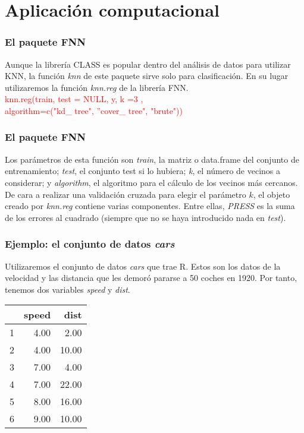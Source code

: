 \documentclass{beamer}
\theoremstyle{definition}
\begin{document}
\section{Aplicación computacional}

\begin{frame}
\frametitle{El paquete FNN}
Aunque la librería CLASS es popular dentro del análisis de datos para utilizar KNN, la función \textit{knn} de este paquete sirve solo para clasificación. En su lugar utilizaremos la función \textit{knn.reg} de la librería FNN. 
\newline
\\
\textcolor{red}{knn.reg(train, test = NULL, y, k =3 , \\ \qquad algorithm=c("kd\_ tree", 
''cover\_ tree", "brute"))}
\newline
\\

\end{frame}

\begin{frame}
\frametitle{El paquete FNN}

Los parámetros de esta función son \textit{train}, la matriz o data.frame del conjunto de entrenamiento; \textit{test}, el conjunto test si lo hubiera; \textit{k}, el número de vecinos a considerar; y \textit{algorithm}, el algoritmo para el cálculo de los vecinos más cercanos.
\newline
\\
De cara a realizar una validación cruzada para elegir el parámetro $k$, el objeto creado por \textit{knn.reg} contiene varias componentes.  Entre ellas, \textit{PRESS} es la suma de los errores al cuadrado (siempre que no se haya introducido nada en \textit{test}).

\end{frame}
\begin{frame}
\frametitle{Ejemplo: el conjunto de datos \textit{cars}}
Utilizaremos el conjunto de datos \textit{cars} que trae R. Estos son los datos de la velocidad y las distancia que les demoró pararse a 50 coches en 1920. Por tanto, tenemos dos variables \textit{speed} y \textit{dist}.
\begin{table}[ht]
\centering
\begin{tabular}{rrr}
  \hline
 & speed & dist \\ 
  \hline
1 & 4.00 & 2.00 \\ 
  2 & 4.00 & 10.00 \\ 
  3 & 7.00 & 4.00 \\ 
  4 & 7.00 & 22.00 \\ 
  5 & 8.00 & 16.00 \\ 
  6 & 9.00 & 10.00 \\ 
   \hline
\end{tabular}
\end{table}

\end{frame}
\end{document}
